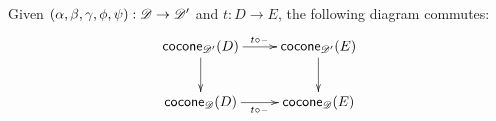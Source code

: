 \documentclass[hott-all.tex]{subfiles}
\begin{document}
% 
\begin{lem}
  Given $(\alpha,\beta,\gamma,\phi,\psi):\mathscr{D} \to \mathscr{D}'$ and $t:D\to E$, the following diagram commutes:
  \begin{equation*}
    \vcenter{\xymatrix{
        \cocone{\Ddiag'}{D}\ar[r]^{t \circ {\blank}}\ar[d] &
        \cocone{\Ddiag'}{E}\ar[d]\\
        \cocone{\Ddiag}{D}\ar[r]_{t \circ {\blank}} &
        \cocone{\Ddiag}{E}
      }}
  \end{equation*}
\end{lem}
\end{document}
